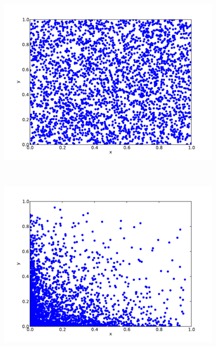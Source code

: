 \begin{figure}
	\begin{center}
		\begin{subfloat}{%
			\includegraphics[scale=0.25]{figures/uniform_distribution.pdf}
		}
		\end{subfloat}~
		\begin{subfloat}{%
			\includegraphics[scale=0.25]{figures/skewed_distribution.pdf}
		}
		\end{subfloat}~

\end{center}
\end{figure}
